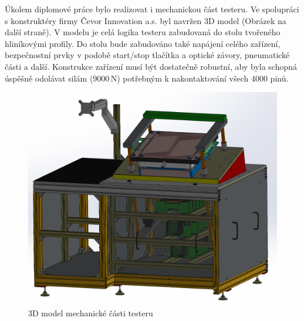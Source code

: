 Úkolem diplomové práce bylo realizovat i mechanickou část testeru.
Ve spolupráci s konstruktéry firmy Čevor Innovation a.s. byl navržen 3D model (Obrázek na další straně).
V modelu je celá logika testeru zabudovaná do stolu tvořeného hliníkovými profily.
Do stolu bude zabudováno také napájení celého zařízení, bezpečnostní prvky
v podobě start/stop tlačítka a optické závory, pneumatické části a další.
Konstrukce zařízení musí být dostatečně robustní, aby byla schopná úspěšně odolávat silám (9000\,N)
potřebným k nakontaktování všech 4000 pinů.
\clearpage

\begin{figure}[ht!]
    \centering
    \includegraphics[width = 1\textwidth]{obrazky/assembly_3D_model.png}
    \caption{3D model mechanické části testeru}
    \label{fig: assembly model}
\end{figure}

